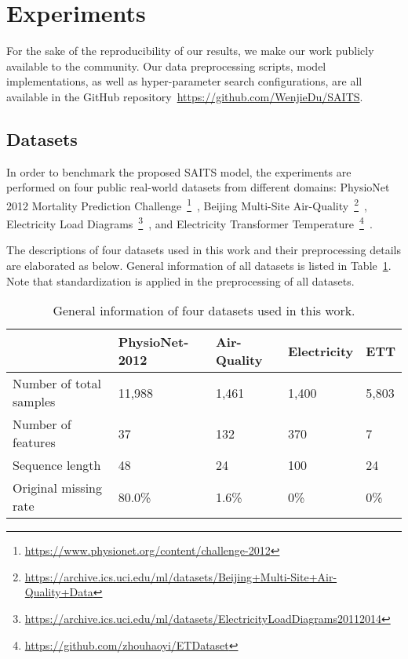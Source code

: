 \documentclass{article}
\begin{document}
\section{Experiments}\label{experiments}
For the sake of the reproducibility of our results, we make our work publicly available to the community. Our data preprocessing scripts, model implementations, as well as hyper-parameter search configurations, are all available in the GitHub repository~\url{https://github.com/WenjieDu/SAITS}.

\subsection{Datasets}
In order to benchmark the proposed SAITS model, the experiments are performed on four public real-world datasets from different domains: PhysioNet 2012 Mortality Prediction Challenge~\footnote{\url{https://www.physionet.org/content/challenge-2012}}~\cite{Silva2012ICU}, Beijing Multi-Site Air-Quality~\footnote{\url{https://archive.ics.uci.edu/ml/datasets/Beijing+Multi-Site+Air-Quality+Data}}~\cite{Zhang2017AirQuality}, Electricity Load Diagrams~\footnote{\url{https://archive.ics.uci.edu/ml/datasets/ElectricityLoadDiagrams20112014}}~\cite{Dua2017UCI}, and Electricity Transformer Temperature~\footnote{\url{https://github.com/zhouhaoyi/ETDataset}}~\cite{Zhou2021informer}.

The descriptions of four datasets used in this work and their preprocessing details are elaborated as below. General information of all datasets is listed in Table~\ref{dataset_info}. Note that standardization is applied in the preprocessing of all datasets.
\begin{table} [!htb]
	\caption{General information of four datasets used in this work.}
	\label{dataset_info}
	\centering
	\begin{tabular}{p{100pt}<{\centering}|p{70pt}<{\centering}|p{70pt}<{\centering}|p{70pt}<{\centering}|p{70pt}<{\centering}}
		\toprule
		& PhysioNet-2012 & Air-Quality  & Electricity & ETT \\
		\midrule
		Number of total samples&  11,988        &  1,461       & 1,400         &  5,803          \\ 
		\midrule
		Number of features     &   37           &  132         & 370                     &       7  \\
		\midrule
		Sequence length        &   48           & \phantom{0}24& 100           &  24  \\ 
		\midrule
		Original missing rate  &  80.0\%        &  1.6\%       & 0\%               &     0\%  \\ 
		\bottomrule
	\end{tabular}
\end{table}
\end{document}
